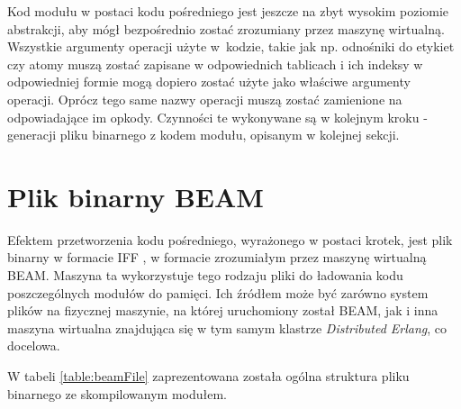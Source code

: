 Kod modułu w postaci kodu pośredniego jest jeszcze na zbyt wysokim poziomie abstrakcji, aby mógł bezpośrednio zostać zrozumiany przez maszynę wirtualną. Wszystkie argumenty operacji użyte w~kodzie, takie jak np. odnośniki do etykiet czy atomy muszą zostać zapisane w odpowiednich tablicach i ich indeksy w odpowiedniej formie mogą dopiero zostać użyte jako właściwe argumenty operacji. Oprócz tego same nazwy operacji muszą zostać zamienione na odpowiadające im opkody. Czynności te wykonywane są w kolejnym kroku - generacji pliku binarnego z kodem modułu, opisanym w kolejnej sekcji.

\section{Plik binarny BEAM}

Efektem przetworzenia kodu pośredniego, wyrażonego w postaci krotek, jest plik binarny w formacie IFF \cite{morrison1985ea}, w formacie zrozumiałym przez maszynę wirtualną BEAM. Maszyna ta wykorzystuje tego rodzaju pliki do ładowania kodu poszczególnych modułów do pamięci. Ich źródłem może być zarówno system plików na fizycznej maszynie, na której uruchomiony został BEAM, jak i inna maszyna wirtualna znajdująca się w tym samym klastrze \emph{Distributed Erlang}, co docelowa.

W tabeli \ref{table:beamFile} zaprezentowana została ogólna struktura pliku binarnego ze skompilowanym modułem.

